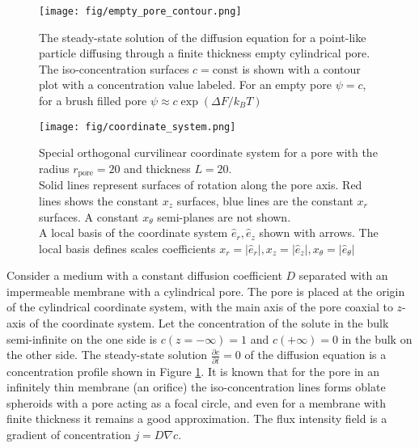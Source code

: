 \documentclass[10pt, a4paper]{article}
\begin{document}
\begin{multicols}{2}

\begin{figure}[H]
    \centering
    \texttt{[image: fig/empty\_pore\_contour.png]}
    \caption{
        The steady-state solution of the diffusion equation for a point-like particle diffusing through a finite thickness empty cylindrical pore.
        The iso-concentration surfaces $c = \textrm{const}$ is shown with a contour plot with a concentration value labeled.
        For an empty pore $\psi = c$, for a brush filled pore $\psi \approx c\exp(\Delta F / k_B T)$
        }
    \label{fig:empty_pore_solution}
\end{figure}
\begin{figure}[H]
    \centering
    \texttt{[image: fig/coordinate\_system.png]}
    \caption{
        Special orthogonal curvilinear coordinate system for a pore with the radius $r_{\textrm{pore}} = 20$ and thickness $L=20$.
        \\
        Solid lines represent surfaces of rotation along the pore axis.
        Red lines shows the constant $x_{z}$ surfaces, blue lines are the constant $x_{r}$ surfaces.
        A constant $x_{\theta}$ semi-planes are not shown.
        \\
        A local basis of the coordinate system $\hat{e}_r, \hat{e}_z$ shown with arrows.
        The local basis defines scales coefficients $x_r = |\hat{e}_r|, x_z = |\hat{e}_z|, x_{\theta} = |\hat{e}_{\theta}|$
        }
    \label{fig:coordinate_system}
\end{figure}

Consider a medium with a constant diffusion coefficient $D$ separated with an impermeable membrane with a cylindrical pore. 
The pore is placed at the origin of the cylindrical coordinate system, with the main axis of the pore coaxial to $z$-axis of the coordinate system.
Let the concentration of the solute in the bulk semi-infinite on the one side is $c(z=-\infty)=1$ and $c(+\infty)=0$ in the bulk on the other side.
The steady-state solution $\frac{\partial c}{\partial t} = 0$ of the diffusion equation is a concentration profile shown in Figure \ref{fig:empty_pore_solution}.
It is known that for the pore in an infinitely thin membrane (an orifice) the iso-concentration lines forms oblate spheroids with a pore acting as a focal circle, and even for a membrane with finite thickness it remains a good approximation. 
The flux intensity field is a gradient of concentration $j = D\nabla c$.


\end{multicols}
\end{document}
